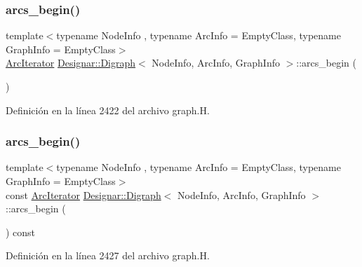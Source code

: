 \subsubsection{\texorpdfstring{arcs\+\_\+begin()}{arcs\_begin()}\hspace{0.1cm}{\footnotesize\ttfamily [1/4]}}
{\footnotesize\ttfamily template$<$typename Node\+Info , typename Arc\+Info  = Empty\+Class, typename Graph\+Info  = Empty\+Class$>$ \\
\hyperlink{class_designar_1_1_digraph_1_1_arc_iterator}{Arc\+Iterator} \hyperlink{class_designar_1_1_digraph}{Designar\+::\+Digraph}$<$ Node\+Info, Arc\+Info, Graph\+Info $>$\+::arcs\+\_\+begin (\begin{DoxyParamCaption}{ }\end{DoxyParamCaption})\hspace{0.3cm}{\ttfamily [inline]}}



Definición en la línea 2422 del archivo graph.\+H.

\mbox{\label{class_designar_1_1_digraph_a1334cd9030f2a409f03a611bb472f5cb}} 
\subsubsection{\texorpdfstring{arcs\+\_\+begin()}{arcs\_begin()}\hspace{0.1cm}{\footnotesize\ttfamily [2/4]}}
{\footnotesize\ttfamily template$<$typename Node\+Info , typename Arc\+Info  = Empty\+Class, typename Graph\+Info  = Empty\+Class$>$ \\
const \hyperlink{class_designar_1_1_digraph_1_1_arc_iterator}{Arc\+Iterator} \hyperlink{class_designar_1_1_digraph}{Designar\+::\+Digraph}$<$ Node\+Info, Arc\+Info, Graph\+Info $>$\+::arcs\+\_\+begin (\begin{DoxyParamCaption}{ }\end{DoxyParamCaption}) const\hspace{0.3cm}{\ttfamily [inline]}}



Definición en la línea 2427 del archivo graph.\+H.

\mbox{\label{class_designar_1_1_digraph_a3c1eeda482f59951e1191ea2e0dd514a}} 
